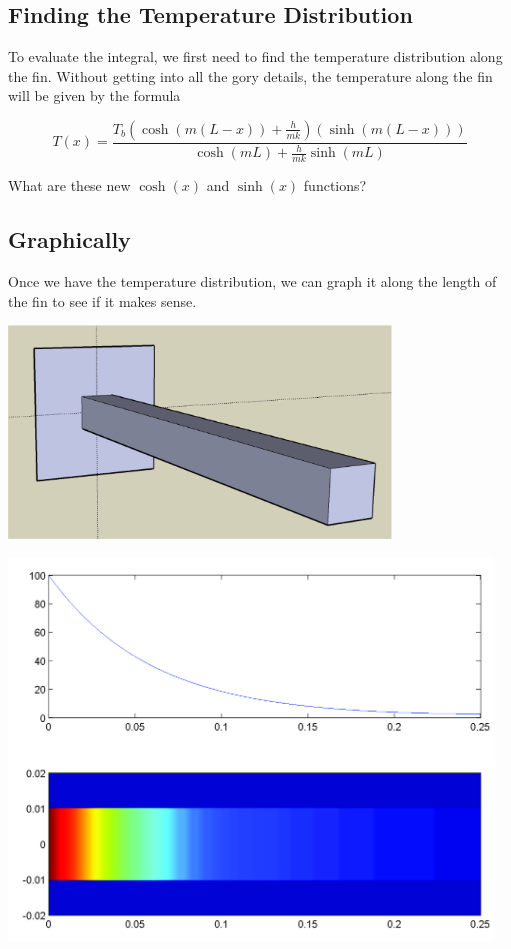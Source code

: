 \newpage

\subsection*{Finding the Temperature Distribution}
To evaluate the integral, we first need to find the temperature
distribution along the fin.  Without getting into all the gory
details, the temperature along the fin will be given by the formula

$$T(x) = \frac{T_b \left(\cosh(m(L-x)) + \frac{h}{mk}\right)\left(\sinh(m(L-x))\right)}{\cosh(mL) + \frac{h}{mk} \sinh(mL)}$$

\problem What are these new $\cosh(x)$ and $\sinh(x)$ functions?



\newpage
\subsection*{Graphically}
Once we have the temperature distribution, we can graph it along the
length of the fin to see if it makes sense.

\begin{center}
\begin{minipage}{4.0in}
\includegraphics[width=4.0in]{graphics/notes_06_LongPin3D}
\end{minipage}
\begin{minipage}{4.0in}
\begin{center}
\includegraphics[height=4.0in]{graphics/notes_06_FinTemperature1}
\end{center}
\end{minipage}
\end{center}



